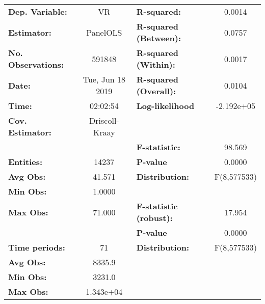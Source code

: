 \begin{center}
\begin{tabular}{lclc}
\toprule
\textbf{Dep. Variable:}                 &         VR         & \textbf{  R-squared:         }   &      0.0014      \\
\textbf{Estimator:}                     &      PanelOLS      & \textbf{  R-squared (Between):}  &      0.0757      \\
\textbf{No. Observations:}              &       591848       & \textbf{  R-squared (Within):}   &      0.0017      \\
\textbf{Date:}                          &  Tue, Jun 18 2019  & \textbf{  R-squared (Overall):}  &      0.0104      \\
\textbf{Time:}                          &      02:02:54      & \textbf{  Log-likelihood     }   &    -2.192e+05    \\
\textbf{Cov. Estimator:}                &   Driscoll-Kraay   & \textbf{                     }   &                  \\
\textbf{}                               &                    & \textbf{  F-statistic:       }   &      98.569      \\
\textbf{Entities:}                      &       14237        & \textbf{  P-value            }   &      0.0000      \\
\textbf{Avg Obs:}                       &       41.571       & \textbf{  Distribution:      }   &   F(8,577533)    \\
\textbf{Min Obs:}                       &       1.0000       & \textbf{                     }   &                  \\
\textbf{Max Obs:}                       &       71.000       & \textbf{  F-statistic (robust):} &      17.954      \\
\textbf{}                               &                    & \textbf{  P-value            }   &      0.0000      \\
\textbf{Time periods:}                  &         71         & \textbf{  Distribution:      }   &   F(8,577533)    \\
\textbf{Avg Obs:}                       &       8335.9       & \textbf{                     }   &                  \\
\textbf{Min Obs:}                       &       3231.0       & \textbf{                     }   &                  \\
\textbf{Max Obs:}                       &     1.343e+04      & \textbf{                     }   &                  \\

\end{tabular}
\end{center}
